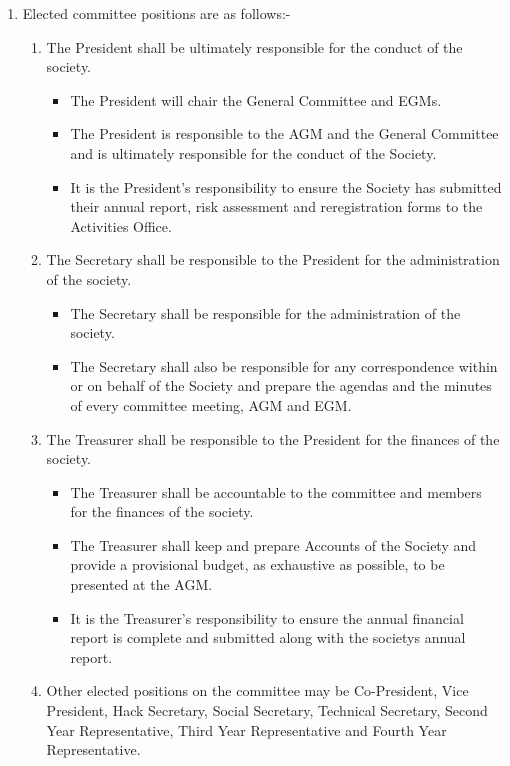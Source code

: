 \begin {enumerate}
  \item Elected committee positions are as follows:-
    \begin{enumerate}
      \item The President shall be ultimately responsible for the conduct of the society.
        \begin{itemize}
          \item The President will chair the General Committee and EGMs.
          \item The President is responsible to the AGM and the General Committee and is ultimately responsible for the conduct of the Society.
          \item It is the President’s responsibility to ensure the Society has submitted their annual report, risk assessment and reregistration forms to the Activities Office.
        \end{itemize}
      \item The Secretary shall be responsible to the President for the administration of the society.
        \begin{itemize}
          \item The Secretary shall be responsible for the administration of the society.
          \item The Secretary shall also be responsible for any correspondence within or on behalf of the Society and prepare the agendas and the minutes of every committee meeting, AGM and EGM.
        \end{itemize}
      \item The Treasurer shall be responsible to the President for the finances of the society.
        \begin{itemize}
          \item The Treasurer shall be accountable to the committee and members for the finances of the society.
          \item The Treasurer shall keep and prepare Accounts of the Society and provide a provisional budget, as exhaustive as possible, to be presented at the AGM.
          \item It is the Treasurer’s responsibility to ensure the annual financial report is complete and submitted along with the society\textquotesingle s annual report.
        \end{itemize}
      \item Other elected positions on the committee may be Co-President, Vice President, Hack Secretary, Social
        Secretary, Technical Secretary, Second Year Representative,
        Third Year Representative and Fourth Year Representative.
    \end{enumerate}


\end{enumerate}
